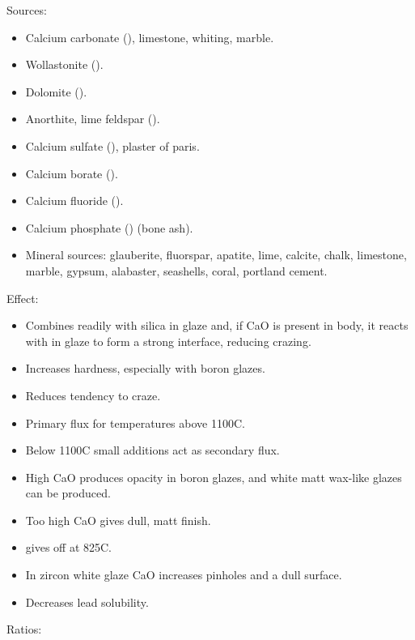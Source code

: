 Sources:
\begin{itemize}
  \item Calcium carbonate (), limestone, whiting, marble.
  \item Wollastonite ().
  \item Dolomite ().
  \item Anorthite, lime feldspar ().
  \item Calcium sulfate (), plaster of paris.
  \item Calcium borate ().
  \item Calcium fluoride ().
  \item Calcium phosphate () (bone ash).
  \item Mineral sources: glauberite, fluorspar, apatite, lime, calcite, chalk, 
  limestone, marble, gypsum, alabaster, seashells, coral, portland cement.
\end{itemize}
Effect:
\begin{itemize}
  \item Combines readily with silica in glaze and, if CaO is present in body, 
  it reacts with  in glaze to form a strong interface, reducing 
  crazing.
 \item Increases hardness, especially with boron glazes.
 \item Reduces tendency to craze.
 \item Primary flux for temperatures above 1100\degree C.
 \item Below 1100\degree C small additions act as secondary flux.
 \item High CaO produces opacity in boron glazes, and white matt wax-like 
 glazes can be produced.
 \item Too high CaO gives dull, matt finish.
 \item {} gives off  at 825\degree  C.
 \item In zircon white glaze CaO increases pinholes and a dull surface.
 \item Decreases lead solubility.
  
\end{itemize}
Ratios:
